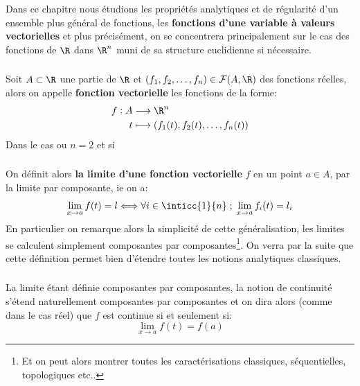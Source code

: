 \chapter*{} %

Dans ce chapitre nous étudions les propriétés analytiques et de régularité d'un ensemble plus général de fonctions, les \textbf{fonctions d'une variable à valeurs vectorielles} et plus précisément, on se concentrera principalement sur le cas des fonctions de \(\R\) dans \(\R^n\) muni de sa structure euclidienne si nécessaire.

\subsection*{}
Soit \(A \subset \R\) une partie de \(\R\) et \((f_1, f_2, \ldots, f_n)  \in \mathcal{F}(A, \R)\) des fonctions réelles, alors on appelle \textbf{fonction vectorielle} les fonctions de la forme:
\[
   \begin{aligned}
      f: A &\longrightarrow \R^n\\
      t &\longmapsto (f_1(t), f_2(t), \ldots, f_n(t))
   \end{aligned}
\]
Dans le cas ou \(n = 2\) et si \(\)

\subsection*{}
On définit alors \textbf{la limite d'une fonction vectorielle} \(f\) en un point \(a \in A\), par la limite par composante, ie on a:
\[
   \lim_{x \rightarrow a} f(t) = l \Longleftrightarrow \forall i \in \inticc{1}{n} \; ; \; \lim_{x \rightarrow a} f_i(t) = l_i  
\]
En particulier on remarque alors la simplicité de cette généralisation, les limites se calculent simplement composantes par composantes\footnote[1]{\label{carac}Et on peut alors montrer toutes les caractérisations classiques, séquentielles, topologiques etc..}. On verra par la suite que cette définition permet bien d'étendre toutes les notions analytiques classiques.

\subsection*{}
La limite étant définie composantes par composantes, la notion de continuité s'étend naturellement composantes par composantes et on dira alors (comme dans le cas réel) que \(f\) est continue si et seulement si:
\[
   \lim_{x \rightarrow a} f(t) = f(a)
\]

